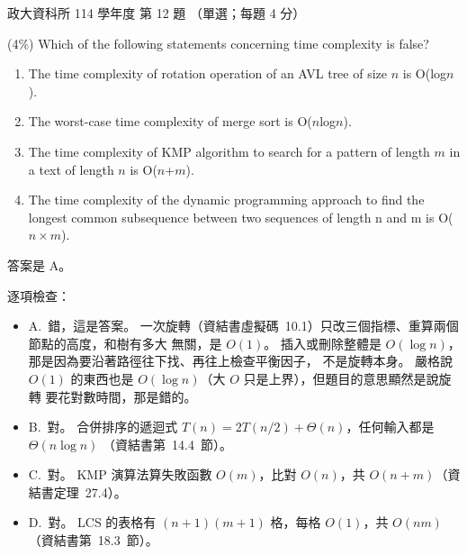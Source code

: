 \begin{pastexam}[label={px:nccu-114-dsa-12}]{政大資科所 114 學年度 第 12 題}
（單選；每題 4 分）

(4\%) Which of the following statements concerning time complexity is false?
\begin{enumerate}[label=\Alph*.]
\item The time complexity of rotation operation of an AVL tree of size $n$ is O(log$n$).
\item The worst-case time complexity of merge sort is O($n$log$n$).
\item The time complexity of KMP algorithm to search for a pattern of length $m$ in a text of length
$n$ is O($n$+$m$).
\item The time complexity of the dynamic programming approach to find the longest common subsequence
between two sequences of length n and m is O($n\times m$).
\end{enumerate}
\end{pastexam}

\begin{pastsoln}
答案是 A。

逐項檢查：
\begin{itemize}
\item A.~錯，這是答案。 一次旋轉（資結書虛擬碼~10.1）只改三個指標、重算兩個節點的高度，和樹有多大
無關，是 $O(1)$。 插入或刪除整體是 $O(\log n)$，那是因為要沿著路徑往下找、再往上檢查平衡因子，
不是旋轉本身。 嚴格說 $O(1)$ 的東西也是 $O(\log n)$（大 $O$ 只是上界），但題目的意思顯然是說旋轉
要花對數時間，那是錯的。
\item B.~對。 合併排序的遞迴式 $T(n) = 2T(n/2) + \Theta(n)$，任何輸入都是 $\Theta(n \log n)$
（資結書第~14.4~節）。
\item C.~對。 KMP 演算法算失敗函數 $O(m)$，比對 $O(n)$，共 $O(n + m)$（資結書定理~27.4）。
\item D.~對。 LCS 的表格有 $(n + 1)(m + 1)$ 格，每格 $O(1)$，共 $O(nm)$（資結書第~18.3~節）。
\end{itemize}
\end{pastsoln}
